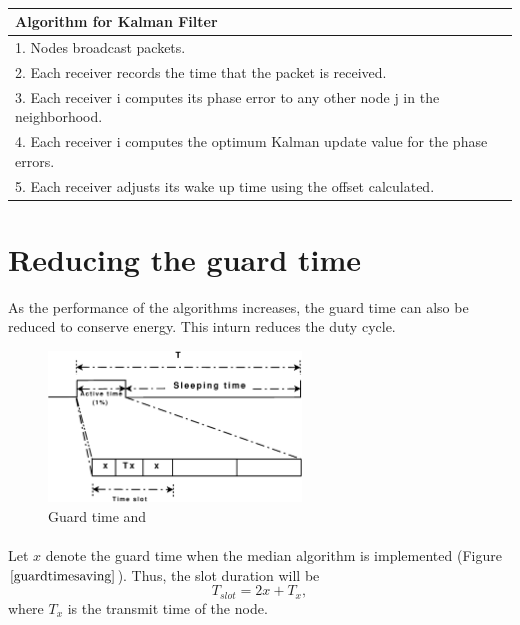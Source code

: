 \documentclass[a4paper,10pt]{report}
\begin{document}
\paragraph*{}
\begin{tabular}{  l }Algorithm for Kalman Filter \\ \hline \hline
1. Nodes broadcast packets. \\  2. Each receiver records the time that the packet is received. \\
3. Each receiver i computes its phase error to any other node j in the neighborhood. \\
4. Each receiver i computes the optimum Kalman update value for the phase errors. \\
5. Each receiver adjusts its wake up time using the offset calculated.\\
\hline \hline
\end{tabular}
\section{\textbf{Reducing the guard time}}
As the performance of the algorithms increases, the guard time can also be reduced to conserve energy. This inturn
reduces the duty cycle.
\begin{figure}
\centering
\includegraphics[width=0.6\textwidth]{guardtimesaving}
\caption{Guard time and } \label{guardtimesaving}
\end{figure}
\paragraph*{}
Let $x$ denote the guard time when the median algorithm is implemented (Figure $\ref{guardtimesaving}$). Thus, the slot
duration will be
\begin{equation}
T_{slot}=2x + T_x ,
\label{slot}
\end{equation}
where $T_x$ is the transmit time of the node.
\end{document}
